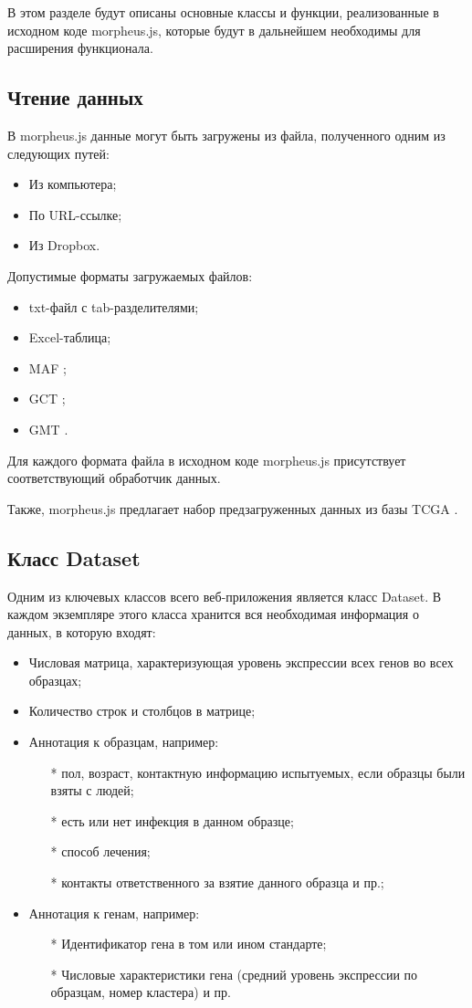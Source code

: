 \documentclass[annotation,specification]{itmo-student-thesis}
\begin{document}
В этом разделе будут описаны основные классы и функции, реализованные в исходном коде morpheus.js, которые будут в дальнейшем необходимы для расширения функционала.

\subsection{Чтение данных}
В morpheus.js данные могут быть загружены из файла, полученного одним из следующих путей:
\begin{itemize}
\item Из компьютера;
\item По URL-ссылке;
\item Из Dropbox.
\end{itemize}

Допустимые форматы загружаемых файлов:
\begin{itemize}
\item txt-файл с tab-разделителями;
\item Excel-таблица;
\item MAF \cite{maf};
\item GCT \cite{gct};
\item GMT \cite{gmt}.
\end{itemize}

Для каждого формата файла в исходном коде morpheus.js присутствует соответствующий обработчик данных.

Также, morpheus.js предлагает набор предзагруженных данных из базы TCGA \cite{tcga}.

\subsection{Класс Dataset}
Одним из ключевых классов всего веб-приложения является класс Dataset. В каждом экземпляре этого класса хранится вся необходимая информация о данных, в которую входят:

\begin{itemize}
\item Числовая матрица, характеризующая уровень экспрессии всех генов во всех образцах;
\item Количество строк и столбцов в матрице;
\item Аннотация к образцам, например:\begin{itemize}
    \item[*] пол, возраст, контактную информацию испытуемых, если образцы были взяты с людей;
    \item[*] есть или нет инфекция в данном образце;
    \item[*] способ лечения;
    \item[*]  контакты ответственного за взятие данного образца и пр.;\end{itemize}
\item Аннотация к генам, например:\begin{itemize}
    \item[*] Идентификатор гена в том или ином стандарте;
    \item[*] Числовые характеристики гена (средний уровень экспрессии по образцам, номер кластера) и пр.\end{itemize}
\end{itemize}
\end{document}

